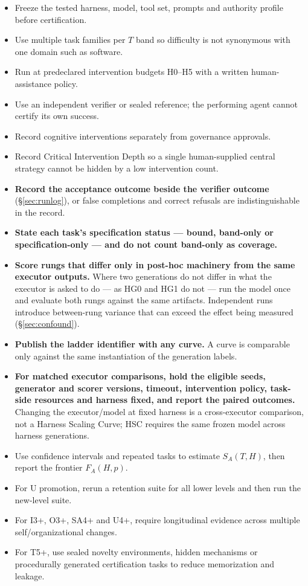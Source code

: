 \documentclass[11pt]{article}
\theoremstyle{definition}
\newcommand{\SA}{\ensuremath{S_A(T,H)}}
\newcommand{\FA}{\ensuremath{F_A(H,p)}}
\begin{document}
\begin{itemize}
\item Freeze the tested harness, model, tool set, prompts and authority profile before certification.
\item Use multiple task families per $T$ band so difficulty is not synonymous with one domain such as software.
\item Run at predeclared intervention budgets H0--H5 with a written human-assistance policy.
\item Use an independent verifier or sealed reference; the performing agent cannot certify its own success.
\item Record cognitive interventions separately from governance approvals.
\item Record Critical Intervention Depth so a single human-supplied central strategy cannot be hidden by a low intervention count.
\item \textbf{Record the acceptance outcome beside the verifier outcome} (\S\ref{sec:runlog}), or false completions and correct refusals are indistinguishable in the record.
\item \textbf{State each task's specification status --- bound, band-only or specification-only --- and do not count band-only as coverage.}
\item \textbf{Score rungs that differ only in post-hoc machinery from the same executor outputs.} Where two generations do not differ in what the executor is asked to do --- as HG0 and HG1 do not --- run the model once and evaluate both rungs against the same artifacts. Independent runs introduce between-rung variance that can exceed the effect being measured (\S\ref{sec:confound}).
\item \textbf{Publish the ladder identifier with any curve.} A curve is comparable only against the same instantiation of the generation labels.
\item \textbf{For matched executor comparisons, hold the eligible seeds, generator and scorer versions, timeout, intervention policy, task-side resources and harness fixed, and report the paired outcomes.} Changing the executor/model at fixed harness is a cross-executor comparison, not a Harness Scaling Curve; HSC requires the same frozen model across harness generations.
\item Use confidence intervals and repeated tasks to estimate \SA{}, then report the frontier \FA{}.
\item For U promotion, rerun a retention suite for all lower levels and then run the new-level suite.
\item For I3+, O3+, SA4+ and U4+, require longitudinal evidence across multiple self/organizational changes.
\item For T5+, use sealed novelty environments, hidden mechanisms or procedurally generated certification tasks to reduce memorization and leakage.
\end{itemize}
\end{document}
